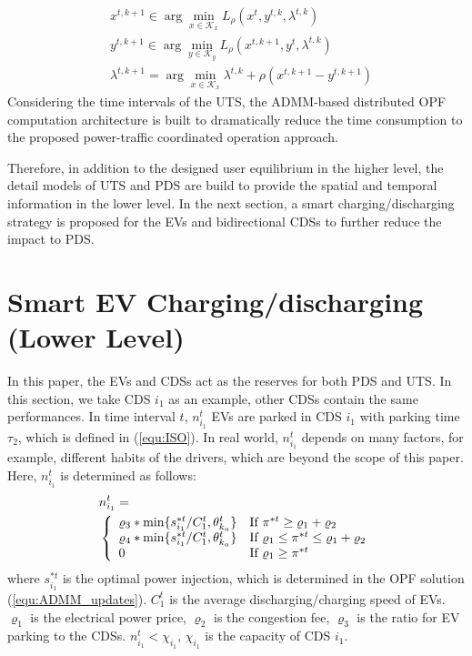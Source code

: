 \documentclass[final]{IEEEtran}
\begin{document}
\begin{subequations}\label{equ:ADMM_updates}
	\begin{align} 
	& x^{t,k+1} \in \arg\min_{x \in \mathcal{K}_x} L_{\rho}(x^t,y^{t,k},\lambda^{t,k}) \label{equ:ADMM_updates_x} \\
	& y^{t,k+1} \in \arg\min_{y \in \mathcal{K}_y} L_{\rho}(x^{t, k+1},y^t,\lambda^{t,k}) \label{equ:ADMM_updates_y} \\
	& \lambda^{t,k+1} = \arg\min_{x \in \mathcal{K}_x} \lambda^{t,k} +\rho(x^{t, k+1} - y^{t, k+1}) \label{equ:ADMM_updates_ru}
	\end{align}
\end{subequations}
Considering the time intervals of the UTS, the ADMM-based distributed OPF computation architecture is built to dramatically reduce the time consumption to the proposed power-traffic coordinated operation approach.

Therefore, in addition to the designed user equilibrium in the higher level, the detail models of UTS and PDS are build to provide the spatial and temporal information in the lower level. In the next section, a smart charging/discharging strategy is proposed for the EVs and bidirectional CDSs to further reduce the impact to PDS.

\section{Smart EV Charging/discharging (Lower Level)}\label{Sec:EVs}

In this paper, the EVs and CDSs act as the reserves for both PDS and UTS. In this section, we take CDS $i_1$ as an example, other CDSs contain the same performances. In time interval $t$, $n^t_{i_1}$ EVs are parked in CDS $i_1$ with parking time $\tau_2$, which is defined in (\ref{equ:ISO}). In real world, $n^t_{i_1}$ depends on many factors, for example, different habits of the drivers, which are beyond the scope of this paper. Here, $n^t_{i_1}$ is determined as follows: 
\begin{equation}\label{equ:park_EV}
\begin{split}
& n^t_{i_1} =  \\
&\left\{ \begin{array}{ll}
\varrho_3 *\min\{s^{*t}_{i_1}/C^t_{1}, \theta^t_{k_a}\} & \mbox{If $\pi^{*t} \geq \varrho_1 + \varrho_2$} \\
\varrho_4 * \min\{s^{*t}_{i_1}/C^t_{1}, \theta^t_{k_a}\}  & \mbox{If $ \varrho_1 \leq \pi^{*t} \leq \varrho_1 + \varrho_2$}  \\
0    & \mbox{If $\varrho_1 \geq \pi^{*t}$}
\end{array}
\right.
\end{split}
\end{equation}
where $ s^{*t}_{i_1}$ is the optimal power injection, which is determined in the OPF solution (\ref{equ:ADMM_updates}). $C^t_{1}$ is the average discharging/charging speed of EVs. $\varrho_1$ is the electrical power price, $\varrho_2$ is the congestion fee, $\varrho_3$ is the ratio for EV parking to the CDSs. $n^t_{i_1} < \chi_{i_1}$, $\chi_{i_1}$ is the capacity of CDS $i_1$.
 
\end{document}
